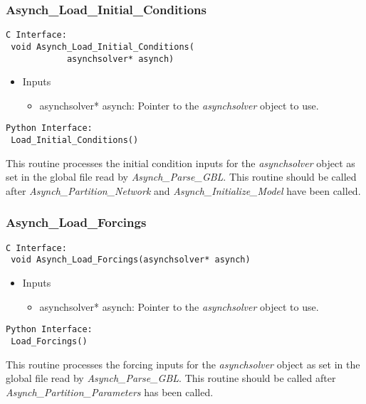 \documentclass[12pt]{article}
\begin{document}
\subsubsection{Asynch\_Load\_Initial\_Conditions} \label{sec: asynch_load_initial_conditions}

\begin{lstlisting}[style=CStyle]
 C Interface:
 void Asynch_Load_Initial_Conditions(
			asynchsolver* asynch)
\end{lstlisting}
\begin{itemize}
 \item Inputs
  \begin{itemize}
   \item asynchsolver* asynch: Pointer to the \emph{asynchsolver} object to use.
  \end{itemize}
\end{itemize}
\begin{lstlisting}[style=PythonStyle]
 Python Interface:
 Load_Initial_Conditions()
\end{lstlisting}
This routine processes the initial condition inputs for the \emph{asynchsolver} object as set in the global file read by \emph{Asynch\_Parse\_GBL}. This routine should be called after \emph{Asynch\_Partition\_Network} and \emph{Asynch\_Initialize\_Model} have been called.


\subsubsection{Asynch\_Load\_Forcings} \label{sec: asynch_load_forcings}

\begin{lstlisting}[style=CStyle]
 C Interface:
 void Asynch_Load_Forcings(asynchsolver* asynch)
\end{lstlisting}
\begin{itemize}
 \item Inputs
  \begin{itemize}
   \item asynchsolver* asynch: Pointer to the \emph{asynchsolver} object to use.
  \end{itemize}
\end{itemize}
\begin{lstlisting}[style=PythonStyle]
 Python Interface:
 Load_Forcings()
\end{lstlisting}
This routine processes the forcing inputs for the \emph{asynchsolver} object as set in the global file read by \emph{Asynch\_Parse\_GBL}. This routine should be called after \emph{Asynch\_Partition\_Parameters} has been called.
\end{document}
